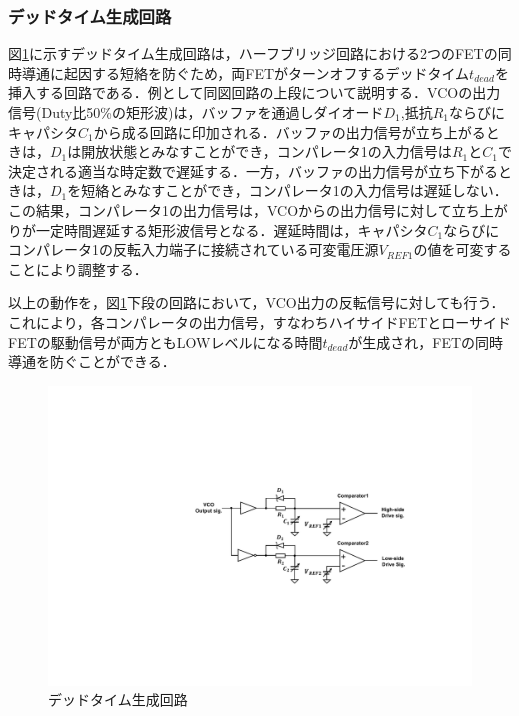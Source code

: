 \subsubsection{デッドタイム生成回路}
図\ref{deadtimegenerator}に示すデッドタイム生成回路は，ハーフブリッジ回路における2つのFETの同時導通に起因する短絡を防ぐため，両FETがターンオフするデッドタイム$t_{dead}$を挿入する回路である．例として同図回路の上段について説明する．VCOの出力信号(Duty比50\%の矩形波)は，バッファを通過しダイオード$D_1$,抵抗$R_1$ならびにキャパシタ$C_1$から成る回路に印加される．バッファの出力信号が立ち上がるときは，$D_1$は開放状態とみなすことができ，コンパレータ1の入力信号は$R_1$と$C_1$で決定される適当な時定数で遅延する．一方，バッファの出力信号が立ち下がるときは，$D_1$を短絡とみなすことができ，コンパレータ1の入力信号は遅延しない．この結果，コンパレータ1の出力信号は，VCOからの出力信号に対して立ち上がりが一定時間遅延する矩形波信号となる．遅延時間は，キャパシタ$C_1$ならびにコンパレータ1の反転入力端子に接続されている可変電圧源$V_{REF1}$の値を可変することにより調整する．\par
以上の動作を，図\ref{deadtimegenerator}下段の回路において，VCO出力の反転信号に対しても行う．これにより，各コンパレータの出力信号，すなわちハイサイドFETとローサイドFETの駆動信号が両方ともLOWレベルになる時間$t_{dead}$が生成され，FETの同時導通を防ぐことができる．

\begin{figure}[h]
\begin{center}

\includegraphics[width=120mm]{figures/deadtimegenerator.pdf}
\caption{デッドタイム生成回路}
\label{deadtimegenerator}

\end{center}
\end{figure}

